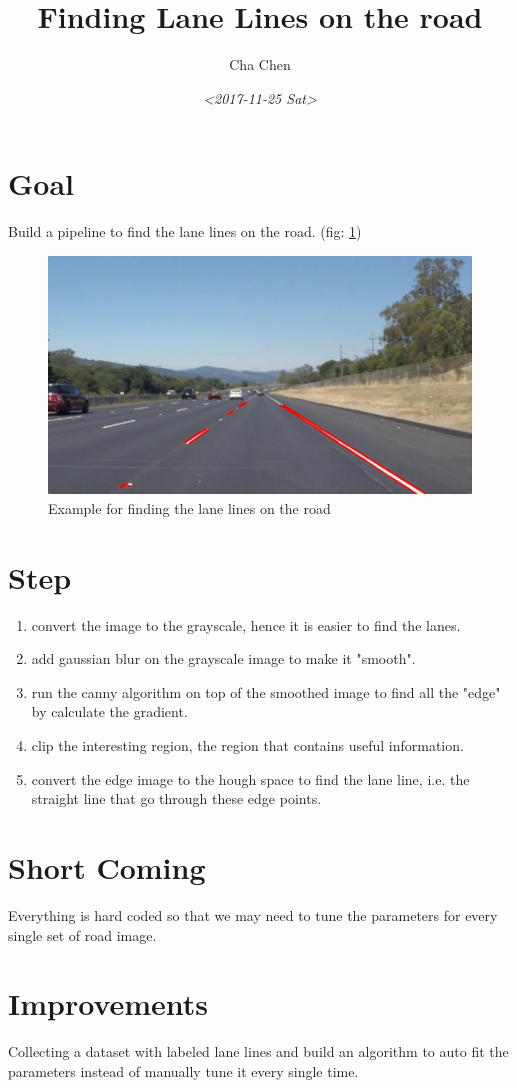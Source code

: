 \documentclass[11pt]{article}
\author{Cha Chen}
\date{\textit{<2017-11-25 Sat>}}
\title{Finding Lane Lines on the road}
\begin{document}
\maketitle
\tableofcontents

\section{Goal}
\label{sec:org7428fcd}
Build a pipeline to find the lane lines on the road. (fig: \ref{fig:org37c61f4})
\begin{figure}[htbp]
\centering
\includegraphics[width=.9\linewidth]{./examples/line-segments-example.jpg}
\caption{\label{fig:org37c61f4}
Example for finding the lane lines on the road}
\end{figure}
\section{Step}
\label{sec:orge6e50ef}
\begin{enumerate}
\item convert the image to the grayscale, hence it is easier to find the lanes.
\item add gaussian blur on the grayscale image to make it "smooth".
\item run the canny algorithm on top of the smoothed image to find all the "edge" by calculate the gradient.
\item clip the interesting region, the region that contains useful information.
\item convert the edge image to the hough space to find the lane line, i.e. the straight line that go through these edge points.
\end{enumerate}
\section{Short Coming}
\label{sec:org992f976}
Everything is hard coded so that we may need to tune the parameters for every single set of road image.
\section{Improvements}
\label{sec:orgd49c568}
Collecting a dataset with labeled lane lines and build an algorithm to auto fit the parameters instead of manually tune it every single time.
\end{document}
